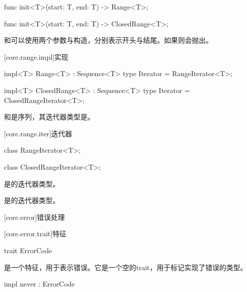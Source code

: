 \begin{itemdecl}
func init<T>(start: T, end: T) -> Range<T>;
\end{itemdecl}

\begin{itemdecl}
func init<T>(start: T, end: T) -> ClosedRange<T>;
\end{itemdecl}

\pnum
{}和可以使用两个参数与构造，分别表示开头与结尾。如果则会抛出。

[core.range.impl]{实现}

\begin{itemdecl}
impl<T> Range<T> : Sequence<T> {
    type Iterator = RangeIterator<T>;
}
\end{itemdecl}

\begin{itemdecl}
impl<T> ClosedRange<T> : Sequence<T> {
    type Iterator = ClosedRangeIterator<T>;
}
\end{itemdecl}

\pnum
{}和是序列，其迭代器类型是。

[core.range.iter]{迭代器}

\begin{itemdecl}
class RangeIterator<T>;
\end{itemdecl}

\begin{itemdecl}
class ClosedRangeIterator<T>;
\end{itemdecl}

\pnum
{}是的迭代器类型。

\pnum
{}是的迭代器类型。

[core.error]{错误处理}

[core.error.trait]{特征}

\begin{itemdecl}
trait ErrorCode { }
\end{itemdecl}

\pnum
{}是一个特征，用于表示错误。它是一个空的trait，用于标记实现了错误的类型。

\begin{itemdecl}
impl never : ErrorCode { }
\end{itemdecl}

